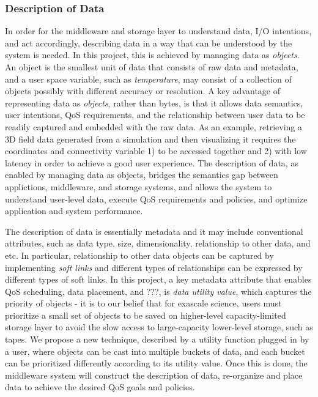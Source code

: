 \subsubsection{Description of Data}
In order for the middleware and storage layer to understand data,
I/O intentions, and act accordingly, describing data in a way that can
be understood by the system is needed. In this project, this is achieved 
by managing data as \textit{objects}.
An object is the smallest unit of data that consists of raw data and metadata,
and a user space variable, such as \textit{temperature}, may consist of a collection
of objects possibly with different accuracy or resolution.
A key advantage of representing data as \textit{objects}, rather than 
bytes, is that it allows data semantics, user intentions, QoS requirements, and
the relationship between user data to be readily captured and embedded with the 
raw data. As an example, retrieving a 3D field data generated from a simulation and then visualizing it
requires the coordinates and connectivity variable 1) to be accessed together and 2) with low
latency in order to achieve a good user experience. The description of data, 
as enabled by managing data as objects, bridges 
the semantics gap between applictions, middleware, and storage systems,
and allows the system to understand user-level data, execute QoS requirements and policies, and
optimize application and system performance.

The description of data is essentially metadata and it may include conventional attributes, such as 
data type, size, dimensionality, relationship to other data, and etc. In particular,
relationship to other data objects can be captured by implementing \textit{soft links}
and different types of relationships can be expressed by different types of soft links. 
In this project, a key metadata attribute
that enables QoS scheduling, data placement, and ???, is \textit{data utility value}, which
captures the priority of objects - it is to our belief that
for exascale science, users must prioritize a small set of objects to be saved on 
higher-level capacity-limited storage layer
to avoid the slow access to large-capacity lower-level storage, such as tapes.
We propose a new technique, described by a utility function plugged in by a user, where objects
can be cast into multiple buckets of data, and each bucket can be prioritized differently according
to its utility value.
Once this is done, the middleware system will construct the description of data, re-organize
and place data to achieve the desired QoS goals and policies.


